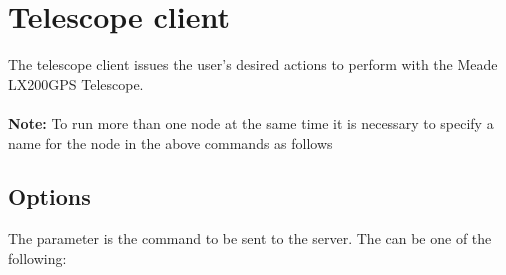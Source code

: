 \documentclass[a4paper,english]{article}
\begin{document}
\section{Telescope client}

The telescope client issues the user's desired actions to perform with the Meade LX200GPS Telescope. \\

     \\

\textbf{Note:} To run more than one  node at the same time it is necessary to specify a name for the node in the above commands as follows 


\subsection{Options}

The  parameter is the command to be sent to the server. The  can be one of the following:
\end{document}
